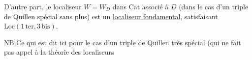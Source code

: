 D'autre part, le localiseur $W=W_D$ dans $\mathrm{Cat}$ associé à $D$ (dans le cas d'un triple de Quillen spécial sans plus)  est un \uline{localiseur fondamental}, satisfaisant   $\mathrm{Loc}(1\,\mathrm{ter},3\,\mathrm{bis})$.

\uline{NB} Ce qui est dit ici pour le cas d'un triple de Quillen très spécial (qui ne fait pas appel à la théorie des localiseurs
